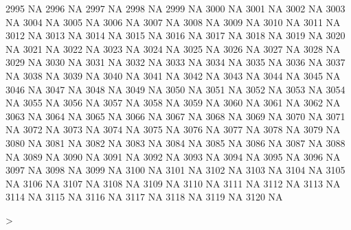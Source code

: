 \documentclass{article}
\begin{document}
\begin{Schunk}
\begin{Soutput}
2995           NA
2996           NA
2997           NA
2998           NA
2999           NA
3000           NA
3001           NA
3002           NA
3003           NA
3004           NA
3005           NA
3006           NA
3007           NA
3008           NA
3009           NA
3010           NA
3011           NA
3012           NA
3013           NA
3014           NA
3015           NA
3016           NA
3017           NA
3018           NA
3019           NA
3020           NA
3021           NA
3022           NA
3023           NA
3024           NA
3025           NA
3026           NA
3027           NA
3028           NA
3029           NA
3030           NA
3031           NA
3032           NA
3033           NA
3034           NA
3035           NA
3036           NA
3037           NA
3038           NA
3039           NA
3040           NA
3041           NA
3042           NA
3043           NA
3044           NA
3045           NA
3046           NA
3047           NA
3048           NA
3049           NA
3050           NA
3051           NA
3052           NA
3053           NA
3054           NA
3055           NA
3056           NA
3057           NA
3058           NA
3059           NA
3060           NA
3061           NA
3062           NA
3063           NA
3064           NA
3065           NA
3066           NA
3067           NA
3068           NA
3069           NA
3070           NA
3071           NA
3072           NA
3073           NA
3074           NA
3075           NA
3076           NA
3077           NA
3078           NA
3079           NA
3080           NA
3081           NA
3082           NA
3083           NA
3084           NA
3085           NA
3086           NA
3087           NA
3088           NA
3089           NA
3090           NA
3091           NA
3092           NA
3093           NA
3094           NA
3095           NA
3096           NA
3097           NA
3098           NA
3099           NA
3100           NA
3101           NA
3102           NA
3103           NA
3104           NA
3105           NA
3106           NA
3107           NA
3108           NA
3109           NA
3110           NA
3111           NA
3112           NA
3113           NA
3114           NA
3115           NA
3116           NA
3117           NA
3118           NA
3119           NA
3120           NA
\end{Soutput}
\begin{Sinput}
> 
\end{Sinput}
\end{Schunk}
\end{document}
